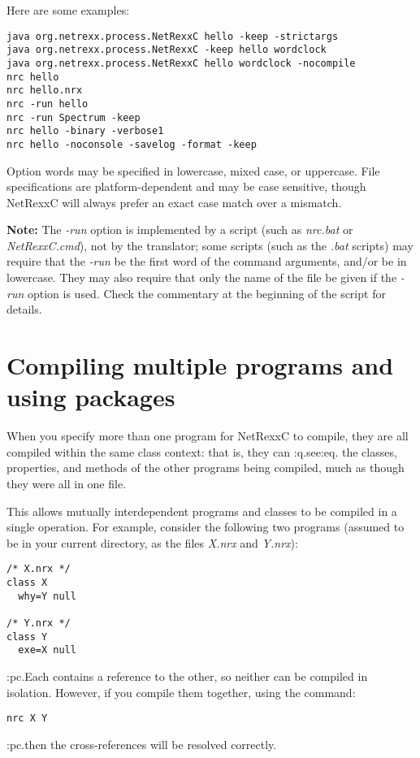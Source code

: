 Here are some examples:
\begin{verbatim}
java org.netrexx.process.NetRexxC hello -keep -strictargs
java org.netrexx.process.NetRexxC -keep hello wordclock
java org.netrexx.process.NetRexxC hello wordclock -nocompile
nrc hello
nrc hello.nrx
nrc -run hello
nrc -run Spectrum -keep
nrc hello -binary -verbose1
nrc hello -noconsole -savelog -format -keep
\end{verbatim}

Option words may be specified in lowercase, mixed case, or uppercase.
File specifications are platform-dependent and may be case sensitive,
though NetRexxC will always prefer an exact case match over a mismatch.

\textbf{Note:} The \emph{-run} option is implemented by a script (such
as \emph{nrc.bat} or \emph{NetRexxC.cmd}), not by the translator; some
scripts (such as the \emph{.bat} scripts) may require that
the \emph{-run} be the first word of the command arguments, and/or be in
lowercase.  They may also require that only the name of the file be
given if the \emph{-run} option is used.  Check the commentary at the
beginning of the script for details.

\section{Compiling multiple programs and using packages}

When you specify more than one program for NetRexxC to compile, they are
all compiled within the same class context: that is, they can :q.see:eq.
the classes, properties, and methods of the other programs being
compiled, much as though they were all in one file.

This allows mutually interdependent programs and classes to be compiled
in a single operation.  For example, consider the following two programs
(assumed to be in your current directory, as the files \emph{X.nrx}
and \emph{Y.nrx}):
\begin{verbatim}
/* X.nrx */
class X
  why=Y null

/* Y.nrx */
class Y
  exe=X null
\end{verbatim}
:pc.Each contains a reference to the other, so neither can be compiled in
isolation.  However, if you compile them together, using the command:
\begin{verbatim}
nrc X Y
\end{verbatim}
:pc.then the cross-references will be resolved correctly.


